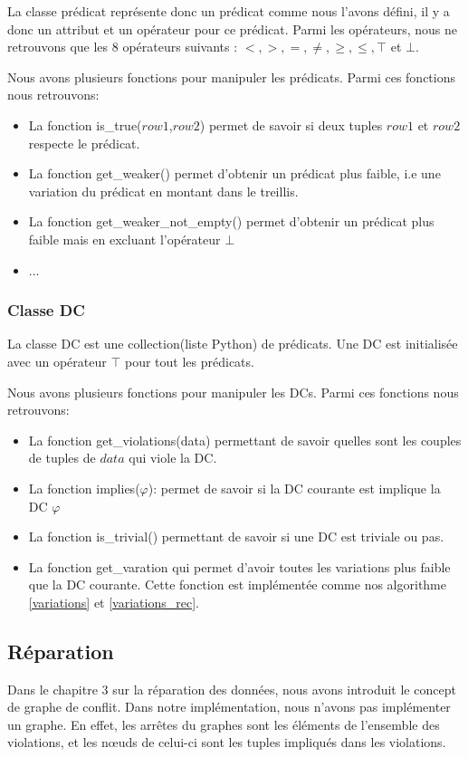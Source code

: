 \documentclass[letterpaper, 12pt]{report}
\theoremstyle{definition}
\begin{document}
La classe prédicat représente donc un prédicat comme nous l'avons défini, il y a donc un attribut et un opérateur pour ce prédicat. Parmi les opérateurs, nous ne retrouvons que les 8 opérateurs suivants : $ < , >, = , \neq , \geq , \leq , \top$ et $\bot $. 

Nous avons plusieurs fonctions pour manipuler les prédicats. Parmi ces fonctions nous retrouvons:
\begin{itemize}
\item La fonction is\_true($row1$,$row2$) permet de savoir si deux tuples $row1$ et $row2$ respecte le prédicat.
\item La fonction get\_weaker() permet d'obtenir un prédicat plus faible, i.e une variation du prédicat en montant dans le treillis.
\item La fonction get\_weaker\_not\_empty() permet d'obtenir un prédicat plus faible mais en excluant l'opérateur $\bot$
\item ...
\end{itemize}

\subsubsection{Classe DC}
\label{classeDC}
La classe DC est une collection(liste Python) de prédicats. Une DC est initialisée avec un opérateur $\top$ pour tout les prédicats.

Nous avons plusieurs fonctions pour manipuler les DCs. Parmi ces fonctions nous retrouvons:
\begin{itemize}
\item La fonction get\_violations(data) permettant de savoir quelles sont les couples de tuples de $data$ qui viole la DC.
\item La fonction implies($\varphi$): permet de savoir si la DC courante est implique la DC $\varphi$
\item La fonction is\_trivial() permettant de savoir si une DC est triviale ou pas.
\item La fonction get\_varation qui permet d'avoir toutes les variations plus faible que la DC courante. Cette fonction est implémentée comme nos algorithme \ref{variations} et \ref{variations_rec}.
\end{itemize}

\subsection{Réparation}

Dans le chapitre 3 sur la réparation des données, nous avons introduit le concept de graphe de conflit. Dans notre implémentation, nous n'avons pas implémenter un graphe. En effet, les arrêtes du graphes sont les éléments de l'ensemble des violations, et les nœuds de celui-ci sont les tuples impliqués dans les violations.
\end{document}
